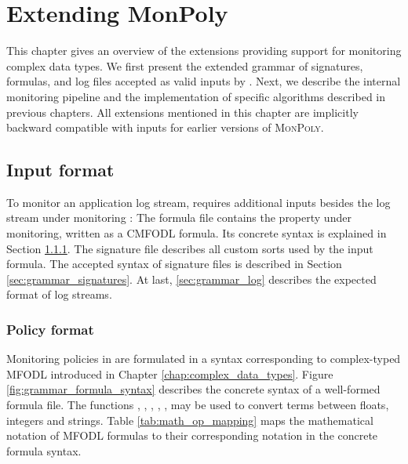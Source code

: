 \chapter{Extending MonPoly}
\label{chap:extending_monpoly}

This chapter gives an overview of the \MonPoly extensions providing support for monitoring complex data types. We first present the extended grammar of signatures, formulas, and log files accepted as valid inputs by \MonPolyN. Next, we describe the internal monitoring pipeline and the implementation of specific algorithms described in previous chapters.
All extensions mentioned in this chapter are implicitly backward compatible with inputs for earlier versions of \textsc{MonPoly}.

\section{Input format}
To monitor an application log stream, \MonPoly requires additional inputs besides the log stream under monitoring \cite{basinMonPolyMonitoringTool2017}: The formula file contains the property under monitoring, written as a CMFODL formula. Its concrete syntax is explained in Section \ref{sec:grammar_formulas}. The signature file describes all custom sorts used by the input formula. The accepted syntax of signature files is described in Section \ref{sec:grammar_signatures}. At last, \ref{sec:grammar_log} describes the expected format of log streams.

\subsection{Policy format}
\label{sec:grammar_formulas}
Monitoring policies in \MonPoly are formulated in a syntax corresponding to complex-typed MFODL introduced in Chapter \ref{chap:complex_data_types}. Figure \ref{fig:grammar_formula_syntax} describes the concrete syntax of a well-formed formula file. The functions , , , , ,  may be used to convert terms between floats, integers and strings. Table \ref{tab:math_op_mapping} maps the mathematical notation of MFODL formulas to their corresponding notation in the concrete formula syntax.

